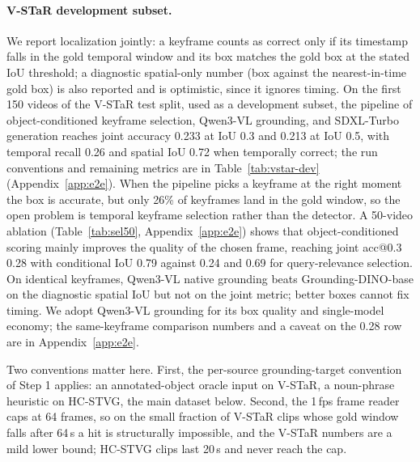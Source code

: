 \documentclass[10pt]{article}
\begin{document}
\paragraph{V-STaR development subset.}
We report localization jointly: a keyframe counts as correct only if its timestamp falls in the gold temporal window and its box matches the gold box at the stated IoU threshold; a diagnostic spatial-only number (box against the nearest-in-time gold box) is also reported and is optimistic, since it ignores timing. On the first 150 videos of the V-STaR test split, used as a development subset, the pipeline of object-conditioned keyframe selection, Qwen3-VL grounding, and SDXL-Turbo generation reaches joint accuracy 0.233 at IoU 0.3 and 0.213 at IoU 0.5, with temporal recall 0.26 and spatial IoU 0.72 when temporally correct; the run conventions and remaining metrics are in Table~\ref{tab:vstar-dev} (Appendix~\ref{app:e2e}). When the pipeline picks a keyframe at the right moment the box is accurate, but only 26\% of keyframes land in the gold window, so the open problem is temporal keyframe selection rather than the detector. A 50-video ablation (Table~\ref{tab:sel50}, Appendix~\ref{app:e2e}) shows that object-conditioned scoring mainly improves the quality of the chosen frame, reaching joint acc@0.3 0.28 with conditional IoU 0.79 against 0.24 and 0.69 for query-relevance selection. On identical keyframes, Qwen3-VL native grounding beats Grounding-DINO-base on the diagnostic spatial IoU but not on the joint metric; better boxes cannot fix timing. We adopt Qwen3-VL grounding for its box quality and single-model economy; the same-keyframe comparison numbers and a caveat on the 0.28 row are in Appendix~\ref{app:e2e}.

Two conventions matter here. First, the per-source grounding-target convention of Step 1 applies: an annotated-object oracle input on V-STaR, a noun-phrase heuristic on HC-STVG, the main dataset below. Second, the 1\,fps frame reader caps at 64 frames, so on the small fraction of V-STaR clips whose gold window falls after 64\,s a hit is structurally impossible, and the V-STaR numbers are a mild lower bound; HC-STVG clips last 20\,s and never reach the cap.
\end{document}
